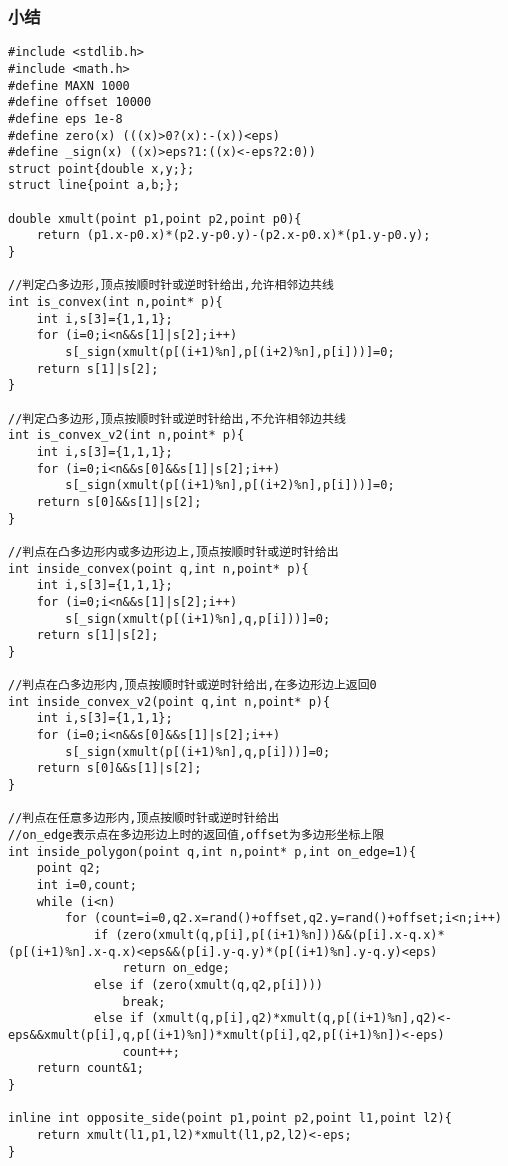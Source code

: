 \documentclass[a4paper]{article}
\begin{document}
\subsubsection{小结}
\begin{lstlisting}
#include <stdlib.h>
#include <math.h>
#define MAXN 1000
#define offset 10000
#define eps 1e-8
#define zero(x) (((x)>0?(x):-(x))<eps)
#define _sign(x) ((x)>eps?1:((x)<-eps?2:0))
struct point{double x,y;};
struct line{point a,b;};
 
double xmult(point p1,point p2,point p0){
    return (p1.x-p0.x)*(p2.y-p0.y)-(p2.x-p0.x)*(p1.y-p0.y);
}
 
//判定凸多边形,顶点按顺时针或逆时针给出,允许相邻边共线
int is_convex(int n,point* p){
    int i,s[3]={1,1,1};
    for (i=0;i<n&&s[1]|s[2];i++)
        s[_sign(xmult(p[(i+1)%n],p[(i+2)%n],p[i]))]=0;
    return s[1]|s[2];
}
 
//判定凸多边形,顶点按顺时针或逆时针给出,不允许相邻边共线
int is_convex_v2(int n,point* p){
    int i,s[3]={1,1,1};
    for (i=0;i<n&&s[0]&&s[1]|s[2];i++)
        s[_sign(xmult(p[(i+1)%n],p[(i+2)%n],p[i]))]=0;
    return s[0]&&s[1]|s[2];
}
 
//判点在凸多边形内或多边形边上,顶点按顺时针或逆时针给出
int inside_convex(point q,int n,point* p){
    int i,s[3]={1,1,1};
    for (i=0;i<n&&s[1]|s[2];i++)
        s[_sign(xmult(p[(i+1)%n],q,p[i]))]=0;
    return s[1]|s[2];
}
 
//判点在凸多边形内,顶点按顺时针或逆时针给出,在多边形边上返回0
int inside_convex_v2(point q,int n,point* p){
    int i,s[3]={1,1,1};
    for (i=0;i<n&&s[0]&&s[1]|s[2];i++)
        s[_sign(xmult(p[(i+1)%n],q,p[i]))]=0;
    return s[0]&&s[1]|s[2];
}
 
//判点在任意多边形内,顶点按顺时针或逆时针给出
//on_edge表示点在多边形边上时的返回值,offset为多边形坐标上限
int inside_polygon(point q,int n,point* p,int on_edge=1){
    point q2;
    int i=0,count;
    while (i<n)
        for (count=i=0,q2.x=rand()+offset,q2.y=rand()+offset;i<n;i++)
            if (zero(xmult(q,p[i],p[(i+1)%n]))&&(p[i].x-q.x)*(p[(i+1)%n].x-q.x)<eps&&(p[i].y-q.y)*(p[(i+1)%n].y-q.y)<eps)
                return on_edge;
            else if (zero(xmult(q,q2,p[i])))
                break;
            else if (xmult(q,p[i],q2)*xmult(q,p[(i+1)%n],q2)<-eps&&xmult(p[i],q,p[(i+1)%n])*xmult(p[i],q2,p[(i+1)%n])<-eps)
                count++;
    return count&1;
}
 
inline int opposite_side(point p1,point p2,point l1,point l2){
    return xmult(l1,p1,l2)*xmult(l1,p2,l2)<-eps;
}
 

\end{lstlisting}
\end{document}
